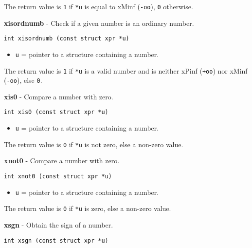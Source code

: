 \documentclass{article}
\begin{document}
The return value is \texttt{1} if \texttt{*u} is equal to
xMinf (\texttt{-oo}), \texttt{0} otherwise.


\hrulefill{}

\textbf{xisordnumb} - Check if a given number is an ordinary number. 

\begin{verbatim}
int xisordnumb (const struct xpr *u)
\end{verbatim}

\begin{itemize}
\item \texttt{u} = pointer to a structure containing a number.
\end{itemize}

The return value is \texttt{1} if \texttt{*u} is a valid number
and is neither xPinf (\texttt{+oo}) nor xMinf (\texttt{-oo}),
else \texttt{0}. 


\hrulefill{}

\textbf{xis0} - Compare a number with zero.

\begin{verbatim}
int xis0 (const struct xpr *u)
\end{verbatim}

\begin{itemize}
\item \texttt{u} = pointer to a structure containing a number.
\end{itemize}

The return value is \texttt{0} if \texttt{*u} is not zero, else a non-zero value.


\hrulefill{}

\textbf{xnot0} - Compare a number with zero.

\begin{verbatim}
int xnot0 (const struct xpr *u)
\end{verbatim}

\begin{itemize}
\item \texttt{u} = pointer to a structure containing a number.
\end{itemize}

The return value is \texttt{0} if \texttt{*u} is zero, else a non-zero value.


\hrulefill{}

\textbf{xsgn} - Obtain the sign of a number.

\begin{verbatim}
int xsgn (const struct xpr *u)
\end{verbatim}
\end{document}
